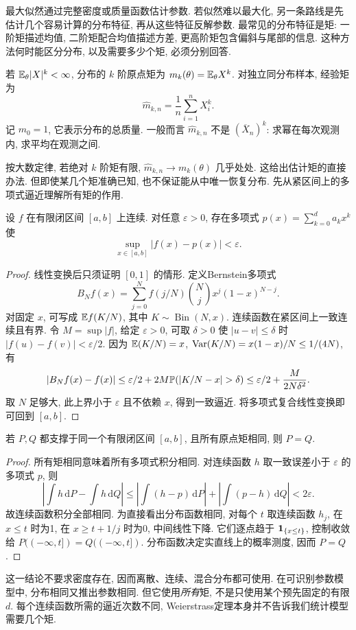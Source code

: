 最大似然通过完整密度或质量函数估计参数. 若似然难以最大化, 另一条路线是先估计几个容易计算的分布特征, 再从这些特征反解参数. 最常见的分布特征是矩: 一阶矩描述均值, 二阶矩配合均值描述方差, 更高阶矩包含偏斜与尾部的信息. 这种方法何时能区分分布, 以及需要多少个矩, 必须分别回答.

\begin{definition}[总体矩与经验矩]
若 $\mathbb E_\theta|X|^k<\infty$, 分布的 $k$ 阶原点矩为 $m_k(\theta)=\mathbb E_\theta X^k$. 对独立同分布样本, 经验矩为
\[
 \widehat m_{k,n}=\frac1n\sum_{i=1}^nX_i^k.
\]
记 $m_0=1$, 它表示分布的总质量. 一般而言 $\widehat m_{k,n}$ 不是 $(\overline X_n)^k$: 求幂在每次观测内, 求平均在观测之间.
\end{definition}
按大数定律, 若绝对 $k$ 阶矩有限, $\widehat m_{k,n}\to m_k(\theta)$ 几乎处处. 这给出估计矩的直接办法. 但即使某几个矩准确已知, 也不保证能从中唯一恢复分布. 先从紧区间上的多项式逼近理解所有矩的作用.

\begin{theorem}[Weierstrass逼近定理]
设 $f$ 在有限闭区间 $[a,b]$ 上连续. 对任意 $\varepsilon>0$, 存在多项式 $p(x)=\sum_{k=0}^da_kx^k$ 使
\[
 \sup_{x\in[a,b]}|f(x)-p(x)|<\varepsilon.
\]
\end{theorem}
\begin{proof}
线性变换后只须证明 $[0,1]$ 的情形. 定义Bernstein多项式
\[
 B_Nf(x)=\sum_{j=0}^Nf(j/N)\binom Njx^j(1-x)^{N-j}.
\]
对固定 $x$, 可写成 $\mathbb E f(K/N)$, 其中 $K\sim\operatorname{Bin}(N,x)$. 连续函数在紧区间上一致连续且有界. 令 $M=\sup|f|$, 给定 $\varepsilon>0$, 可取 $\delta>0$ 使 $|u-v|\le\delta$ 时 $|f(u)-f(v)|<\varepsilon/2$. 因为 $\mathbb E(K/N)=x$, $\operatorname{Var}(K/N)=x(1-x)/N\le1/(4N)$, 有
\[
 |B_Nf(x)-f(x)|\le\varepsilon/2+2M\PP(|K/N-x|>\delta)
 \le\varepsilon/2+\frac{M}{2N\delta^2}.
\]
取 $N$ 足够大, 此上界小于 $\varepsilon$ 且不依赖 $x$, 得到一致逼近. 将多项式复合线性变换即可回到 $[a,b]$.
\end{proof}

\begin{corollary}[紧支撑上的矩确定分布]
若 $P,Q$ 都支撑于同一个有限闭区间 $[a,b]$, 且所有原点矩相同, 则 $P=Q$.
\end{corollary}
\begin{proof}
所有矩相同意味着所有多项式积分相同. 对连续函数 $h$ 取一致误差小于 $\varepsilon$ 的多项式 $p$, 则
\[
 \left|\int h\,\mathrm dP-\int h\,\mathrm dQ\right|
 \le\left|\int(h-p)\,\mathrm dP\right|+
 \left|\int(p-h)\,\mathrm dQ\right|<2\varepsilon.
\]
故连续函数积分全部相同. 为直接看出分布函数相同, 对每个 $t$ 取连续函数 $h_j$, 在 $x\le t$ 时为1, 在 $x\ge t+1/j$ 时为0, 中间线性下降. 它们逐点趋于 $\mathbf 1_{\{x\le t\}}$, 控制收敛给 $P(( -\infty,t])=Q(( -\infty,t])$. 分布函数决定实直线上的概率测度, 因而 $P=Q$.
\end{proof}
这一结论不要求密度存在, 因而离散、连续、混合分布都可使用. 在可识别参数模型中, 分布相同又推出参数相同. 但它使用\emph{所有}矩, 不是只使用某个预先固定的有限 $d$. 每个连续函数所需的逼近次数不同, Weierstrass定理本身并不告诉我们统计模型需要几个矩.

